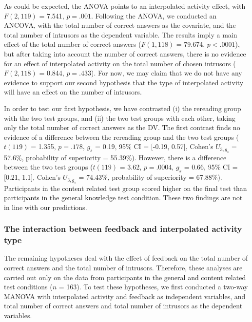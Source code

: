 \documentclass[11pt,]{article}
\begin{document}
As could be expected, the ANOVA points to an interpolated activity
effect, with \(F(2, 119)\) = 7.541, \(p = .001\). Following the ANOVA,
we conducted an ANCOVA, with the total number of correct answers as the
covariate, and the total number of intrusors as the dependent variable.
The results imply a main effect of the total number of correct answers
(\(F(1, 118)\) = 79.674, \(p < .0001\)), but after taking into account
the number of correct answers, there is no evidence for an effect of
interpolated activity on the total number of chosen intrusors
(\(F (2, 118)\) = 0.844, \(p = .433\)). For now, we may claim that we do
not have any evidence to support our second hypothesis that the type of
interpolated activity will have an effect on the number of intrusors.

In order to test our first hypothesis, we have contrasted (i) the
rereading group with the two test groups, and (ii) the two test groups
with each other, taking only the total number of correct answers as the
DV. The first contrast finds no evidence of a difference between the
rereading group and the two test groups (\(t(119)\) = 1.355,
\(p = .178\), \(g_s\) = 0.19, 95\% CI = {[}-0.19, 0.57{]}, Cohen's
\(U_{3, g_s}\) = 57.6\%, probability of superiority = 55.39\%). However,
there is a difference between the two test groups (\(t(119)\) = 3.62,
\(p = .0004\), \(g_s\) = 0.66, 95\% CI = {[}0.21, 1.1{]}, Cohen's
\(U_{3, g_s}\) = 74.43\%, probability of superiority = 67.88\%).
Participants in the content related test group scored higher on the
final test than participants in the general knowledge test condition.
These two findings are not in line with our predictions.

\hypertarget{the-interaction-between-feedback-and-interpolated-activity-type}{%
\subsubsection{The interaction between feedback and interpolated
activity
type}\label{the-interaction-between-feedback-and-interpolated-activity-type}}

The remaining hypotheses deal with the effect of feedback on the total
number of correct answers and the total number of intrusors. Therefore,
these analyses are carried out only on the data from participants in the
general and content related test conditions (\(n\) = 163). To test these
hypotheses, we first conducted a two-way MANOVA with interpolated
activity and feedback as independent variables, and total number of
correct answers and total number of intrusors as the dependent
variables.
\end{document}
